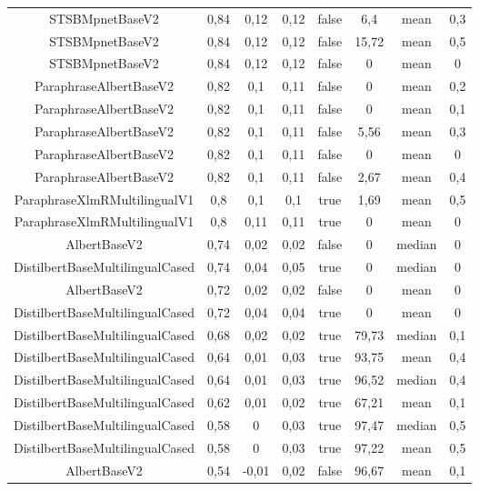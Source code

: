 \documentclass[\main/main.tex]{subfiles}
\begin{document}
\begin{table}
{\begin{tabular}{||c|c|c|c|c|c|c|c||}
STSBMpnetBaseV2                 & 0,84 & 0,12  & 0,12  & false & 6,4   & mean   & 0,3 \\
STSBMpnetBaseV2                 & 0,84 & 0,12  & 0,12  & false & 15,72 & mean   & 0,5 \\
STSBMpnetBaseV2                 & 0,84 & 0,12  & 0,12  & false & 0     & mean   & 0   \\
ParaphraseAlbertBaseV2          & 0,82 & 0,1   & 0,11  & false & 0     & mean   & 0,2 \\
ParaphraseAlbertBaseV2          & 0,82 & 0,1   & 0,11  & false & 0     & mean   & 0,1 \\
ParaphraseAlbertBaseV2          & 0,82 & 0,1   & 0,11  & false & 5,56  & mean   & 0,3 \\
ParaphraseAlbertBaseV2          & 0,82 & 0,1   & 0,11  & false & 0     & mean   & 0   \\
ParaphraseAlbertBaseV2          & 0,82 & 0,1   & 0,11  & false & 2,67  & mean   & 0,4 \\
ParaphraseXlmRMultilingualV1    & 0,8  & 0,1   & 0,1   & true  & 1,69  & mean   & 0,5 \\
ParaphraseXlmRMultilingualV1    & 0,8  & 0,11  & 0,11  & true  & 0     & mean   & 0   \\
AlbertBaseV2                    & 0,74 & 0,02  & 0,02  & false & 0     & median & 0   \\
DistilbertBaseMultilingualCased & 0,74 & 0,04  & 0,05  & true  & 0     & median & 0   \\
AlbertBaseV2                    & 0,72 & 0,02  & 0,02  & false & 0     & mean   & 0   \\
DistilbertBaseMultilingualCased & 0,72 & 0,04  & 0,04  & true  & 0     & mean   & 0   \\
DistilbertBaseMultilingualCased & 0,68 & 0,02  & 0,02  & true  & 79,73 & median & 0,1 \\
DistilbertBaseMultilingualCased & 0,64 & 0,01  & 0,03  & true  & 93,75 & mean   & 0,4 \\
DistilbertBaseMultilingualCased & 0,64 & 0,01  & 0,03  & true  & 96,52 & median & 0,4 \\
DistilbertBaseMultilingualCased & 0,62 & 0,01  & 0,02  & true  & 67,21 & mean   & 0,1 \\
DistilbertBaseMultilingualCased & 0,58 & 0     & 0,03  & true  & 97,47 & median & 0,5 \\
DistilbertBaseMultilingualCased & 0,58 & 0     & 0,03  & true  & 97,22 & mean   & 0,5 \\
AlbertBaseV2                    & 0,54 & -0,01 & 0,02  & false & 96,67 & mean   & 0,1 \\

\end{tabular}}
\end{table}
\end{document}
